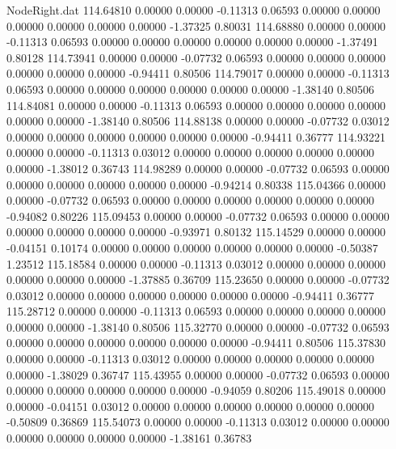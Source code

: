 \begin{filecontents}{NodeRight.dat}
 114.64810    0.00000    0.00000    -0.11313    0.06593    0.00000    0.00000    0.00000    0.00000    0.00000    0.00000   -1.37325    0.80031
 114.68880    0.00000    0.00000    -0.11313    0.06593    0.00000    0.00000    0.00000    0.00000    0.00000    0.00000   -1.37491    0.80128
 114.73941    0.00000    0.00000    -0.07732    0.06593    0.00000    0.00000    0.00000    0.00000    0.00000    0.00000   -0.94411    0.80506
 114.79017    0.00000    0.00000    -0.11313    0.06593    0.00000    0.00000    0.00000    0.00000    0.00000    0.00000   -1.38140    0.80506
 114.84081    0.00000    0.00000    -0.11313    0.06593    0.00000    0.00000    0.00000    0.00000    0.00000    0.00000   -1.38140    0.80506
 114.88138    0.00000    0.00000    -0.07732    0.03012    0.00000    0.00000    0.00000    0.00000    0.00000    0.00000   -0.94411    0.36777
 114.93221    0.00000    0.00000    -0.11313    0.03012    0.00000    0.00000    0.00000    0.00000    0.00000    0.00000   -1.38012    0.36743
 114.98289    0.00000    0.00000    -0.07732    0.06593    0.00000    0.00000    0.00000    0.00000    0.00000    0.00000   -0.94214    0.80338
 115.04366    0.00000    0.00000    -0.07732    0.06593    0.00000    0.00000    0.00000    0.00000    0.00000    0.00000   -0.94082    0.80226
 115.09453    0.00000    0.00000    -0.07732    0.06593    0.00000    0.00000    0.00000    0.00000    0.00000    0.00000   -0.93971    0.80132
 115.14529    0.00000    0.00000    -0.04151    0.10174    0.00000    0.00000    0.00000    0.00000    0.00000    0.00000   -0.50387    1.23512
 115.18584    0.00000    0.00000    -0.11313    0.03012    0.00000    0.00000    0.00000    0.00000    0.00000    0.00000   -1.37885    0.36709
 115.23650    0.00000    0.00000    -0.07732    0.03012    0.00000    0.00000    0.00000    0.00000    0.00000    0.00000   -0.94411    0.36777
 115.28712    0.00000    0.00000    -0.11313    0.06593    0.00000    0.00000    0.00000    0.00000    0.00000    0.00000   -1.38140    0.80506
 115.32770    0.00000    0.00000    -0.07732    0.06593    0.00000    0.00000    0.00000    0.00000    0.00000    0.00000   -0.94411    0.80506
 115.37830    0.00000    0.00000    -0.11313    0.03012    0.00000    0.00000    0.00000    0.00000    0.00000    0.00000   -1.38029    0.36747
 115.43955    0.00000    0.00000    -0.07732    0.06593    0.00000    0.00000    0.00000    0.00000    0.00000    0.00000   -0.94059    0.80206
 115.49018    0.00000    0.00000    -0.04151    0.03012    0.00000    0.00000    0.00000    0.00000    0.00000    0.00000   -0.50809    0.36869
 115.54073    0.00000    0.00000    -0.11313    0.03012    0.00000    0.00000    0.00000    0.00000    0.00000    0.00000   -1.38161    0.36783

\end{filecontents}
